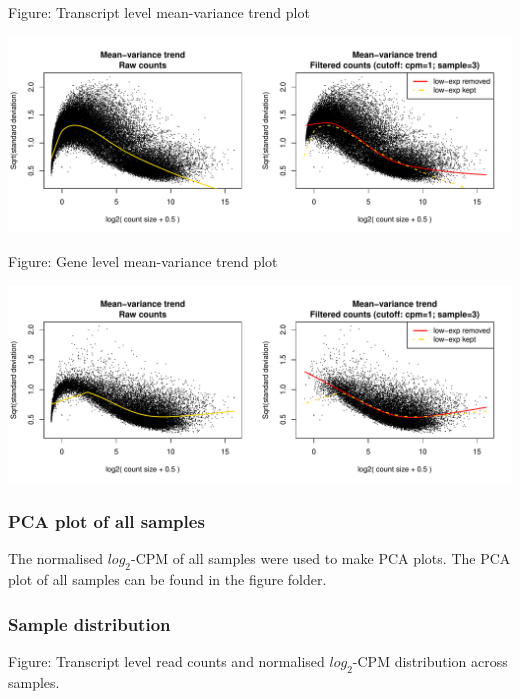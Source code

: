 \documentclass[]{article}
\begin{document}
Figure: Transcript level mean-variance trend plot

\includegraphics[width=23.96in]{X2025.01.13.16.34.12.j145/figure/Transcript mean-variance trend}

Figure: Gene level mean-variance trend plot

\includegraphics[width=23.96in]{X2025.01.13.16.34.12.j145/figure/Gene mean-variance trend}

\subsubsection{PCA plot of all samples}\label{pca-plot-of-all-samples}

The normalised \(log_2\)-CPM of all samples were used to make PCA plots.
The PCA plot of all samples can be found in the figure folder.

\subsubsection{Sample distribution}\label{sample-distribution}

Figure: Transcript level read counts and normalised \(log_2\)-CPM
distribution across samples.
\end{document}
